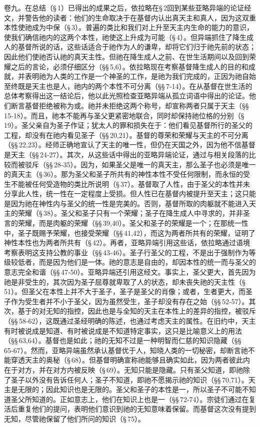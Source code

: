 卷九。在总结（§\,1）已得出的成果之后，依拉略在§\,2回到某些亚略异端的论证经文，并警告他的读者：他们的生命取决于在基督内认出真天主和真人，因为这双重本性使祂成为中保（§\,3）。普遍的类比和我们对上升至天主内生命的能力的意识，使我们确信祂内的这两个本性，祂使这上升成为可能（§\,4）。但异端抓住了降生成人的基督所说的话，这些话适合于祂作为人的谦卑，却将它们归于祂先前的状态；因此他们使祂否认祂的真天主性。但祂在降生成人之前、在世生活期间以及回到荣耀之后的言论，必须仔细区分（§§\,5,6）。依拉略现在考察基督降生成人的目的和成就，并表明祂为人类的工作是一个神圣的工作，是祂为我们完成的，正因为祂自始至终既是天主也是人，祂内的两个本性不可分离（§§\,7‑14）。在从基督在世生活的总体考察得出这一结论后，他以此光照检查亚略异端从孤立词语中得出的论证。他们断言基督拒绝被称为或。祂并未拒绝这两个称号，却宣称两者只属于天主（§§\,15‑18）。而且，祂本不能再与圣父更紧密地联合，同时却保持祂位格的分别（§\,19）。圣父亲自为圣子作证；犹太人的罪和损失在于：他们看见基督所行的圣父的工程，却没有在祂内看见圣子（§§\,20,21）。基督的尊荣和荣耀与天主的不可分离（§§\,22,23）。经师正确地宣认了天主的唯一性，但仍在天国之外，因为他不信基督是天主（§§\,24‑27）。其次，从这些话中得出的亚略异端论证，通过与相关段落的比较而被驳斥（§§\,28‑35）。因为，如果圣父是唯一的真天主，那么圣子也必须是唯一的真天主（§\,36）。那为圣父和圣子所共有的神性本性不受任何限制，而永恒的受生不能被任何受造物的类比所说明（§\,37）。基督取了人性，由于圣父的本性并未分享此人性，统一性在一定程度上受损。但人性已在基督内被提升至天主；这只能是因为祂在神性内与圣父的统一性是完美的。否则，基督所取的肉躯就不能进入天主的荣耀（§\,38）。圣父和圣子只有一个荣耀；圣子在降生成人中寻求的，并非圣言的荣耀，而是肉躯的荣耀（§§\,39,40）。圣父和圣子的荣耀是一个；在那统一性中，圣子既赐予荣耀，也接受荣耀（§§\,41,42），而这为两者所共有的荣耀，证明了神性本性也为两者所共有（§\,42）。再者，亚略异端引用这些话，依拉略通过语境考察表明这支持公教的事业（§§\,43‑46）。圣子行圣父的工程，不是出于强制作为等级较低者，而是因为他们是一体。祂的意志是自由的，却因本性的统一而与圣父的意志完全和谐（§§\,47‑50）。亚略异端还引用这经文。事实上，圣父更大，首先因为祂是非受生的，其次因为圣子屈尊就卑取了人的状态，却未丧失祂的天主性（§\,51）。但圣父在本性上并不大于圣子，圣子是圣父的肖像；或者，生者更大，而圣子作为受生者并不小于圣父，因为虽然受生，圣子却没有存在之始（§§\,52‑57）。其次，基于的对无知的指控，因此也是与全知的天主在本性上的差异的指控，被驳斥（§§\,58‑62），这既通过圣经明确的陈述，也通过考虑天主的属性。在旧约中，天主有时被说成是知道、有时被说成是不知道特定事实，这只是比喻意义上的用法（§§\,63,64）。基督也是如此；祂的无知不过是一种明智而仁慈的知识隐藏（§§\,65‑67）。然而，亚略异端虽然承认基督优于人，知晓人类的一切秘密，却断言祂不能穿透天主的奥秘（§\,68）。但基督明确宣称祂能够且确实如此，因为两者彼此内在于对方，并在对方内被反映（§\,69）。无知只能是隐藏。只有圣父知道，即祂除了圣子以外没有告诉任何人；圣子不知道，即祂不愿揭示祂的知识（§§\,70,71）。天主是无限的；因此知识也是无限的。圣父和圣子的本性是一，所以圣子不可能不知道圣父所知道的。正如意志上，他们在知识上也是一（§§\,72‑74）。宗徒们通过在复活后重复他们的提问，表明他们意识到祂的无知意味着保留。而基督这次没有提到无知，尽管祂保留了他们所问的知识（§\,75）。\par

